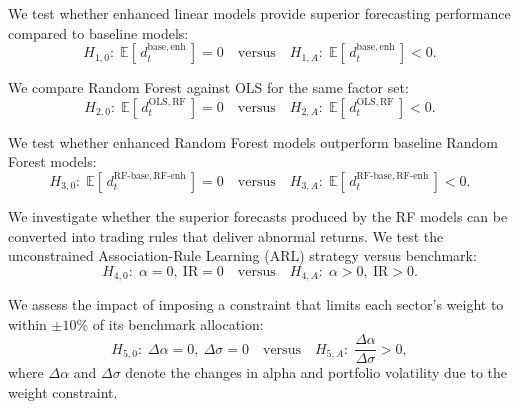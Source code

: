 
\setcounter{hyp}{0}

\begin{hyp} \label{hyp:dm1}
We test whether enhanced linear models provide superior forecasting performance compared to baseline models:
\[
H_{1,0}:\;\mathbb{E}[\,d^{\mathrm{base,enh}}_{t}\,]=0
\quad\text{versus}\quad
H_{1,A}:\;\mathbb{E}[\,d^{\mathrm{base,enh}}_{t}\,]<0.
\]
\end{hyp}

\begin{hyp} \label{hyp:dm2}
We compare Random Forest against OLS for the same factor set:
\[
H_{2,0}:\;\mathbb{E}[\,d^{\mathrm{OLS,RF}}_{t}\,]=0
\quad\text{versus}\quad
H_{2,A}:\;\mathbb{E}[\,d^{\mathrm{OLS,RF}}_{t}\,]<0.
\]
\end{hyp}

\begin{hyp} \label{hyp:dm3}
We test whether enhanced Random Forest models outperform baseline Random Forest models:
\[
H_{3,0}:\;\mathbb{E}[\,d^{\mathrm{RF\text{-}base,RF\text{-}enh}}_{t}\,]=0
\quad\text{versus}\quad
H_{3,A}:\;\mathbb{E}[\,d^{\mathrm{RF\text{-}base,RF\text{-}enh}}_{t}\,]<0.
\]
\end{hyp}

\begin{hyp} \label{hyp:trading1}
We investigate whether the superior forecasts produced by the RF models can be converted into trading rules that deliver abnormal returns. We test the unconstrained Association-Rule Learning (ARL) strategy versus benchmark:
\[
H_{4,0}:\;\alpha = 0,\ \mathrm{IR} = 0
\quad\text{versus}\quad
H_{4,A}:\;\alpha > 0,\ \mathrm{IR} > 0.
\]
\end{hyp}

\begin{hyp} \label{hyp:trading2}
We assess the impact of imposing a constraint that limits each sector's weight to within $\pm10\%$ of its benchmark allocation:
\[
H_{5,0}:\;\Delta\alpha = 0,\ \Delta\sigma = 0
\quad\text{versus}\quad
H_{5,A}:\;\frac{\Delta\alpha}{\Delta\sigma} > 0,
\]
where $\Delta\alpha$ and $\Delta\sigma$ denote the changes in alpha and portfolio volatility due to the weight constraint.
\end{hyp}

